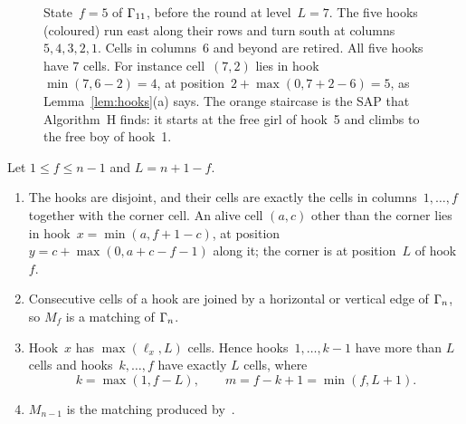 \begin{figure}[ht]
\centering

\caption{State~$f=5$ of $\Gamma_{11}$, before the round at level~$L=7$. The
five hooks (coloured) run east along their rows and turn south at
columns~$5,4,3,2,1$. Cells in columns~$6$ and beyond are retired. All
five hooks have $7$ cells. For instance cell~$(7,2)$ lies in
hook~$\min(7,6-2)=4$, at position~$2+\max(0,7+2-6)=5$, as
Lemma~\ref{lem:hooks}(a) says. The orange staircase is the SAP that
Algorithm~H finds: it starts at the free girl of hook~5 and climbs to the
free boy of hook~1.}
\label{fig:hooks}
\end{figure}

\begin{lemma}
\label{lem:hooks}
Let $1\le f\le n-1$ and $L=n+1-f$.
\begin{enumerate}[label=(\alph*)]
\item The hooks are disjoint, and their cells are exactly the cells in
  columns~$1,\ldots,f$ together with the corner cell. An alive cell
  $(a,c)$ other than the corner lies in hook~$x=\min(a,f+1-c)$, at position
  $y=c+\max(0,a+c-f-1)$ along it; the corner is at position~$L$ of
  hook~$f$.
\item Consecutive cells of a hook are joined by a horizontal or vertical
  edge of $\Gamma_n$, so $M_f$ is a matching of $\Gamma_n$.
\item Hook~$x$ has $\max(\ell_x,L)$ cells. Hence hooks~$1,\ldots,k-1$
  have more than $L$ cells and hooks~$k,\ldots,f$ have exactly $L$ cells,
  where
  \[
      k=\max(1,f-L),\qquad m=f-k+1=\min(f,L+1).
  \]
\item $M_{n-1}$ is the matching produced by~.
\end{enumerate}
\end{lemma}

